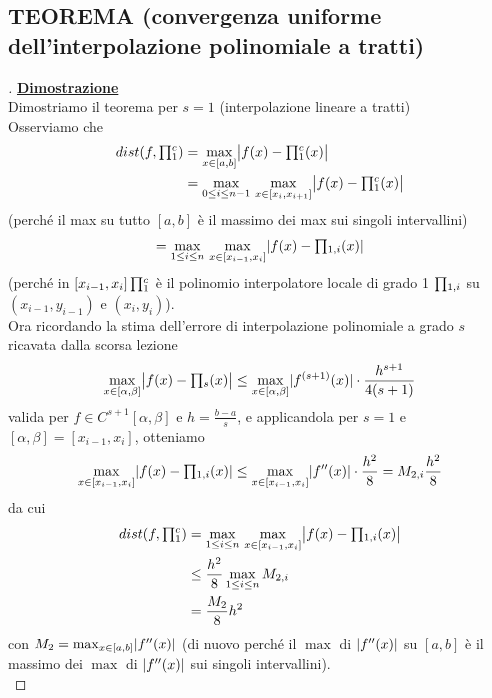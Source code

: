 \subsection{TEOREMA (convergenza uniforme dell'interpolazione polinomiale a tratti)}
\begin{center}
\end{center}

\begin{proof}[\unskip\nopunct]
\textbf{\uline{Dimostrazione}}\\
Dimostriamo il teorema per $s=1$ (interpolazione lineare a tratti)\\
Osserviamo che
\[ \begin{split}
    dist(f, \inter_{1}^{c}) & = \max_{x \in [a,b]} \abs*{f(x) - \inter_{1}^{c} (x)} \\
    & = \max_{0 \le i \le n-1}\, \max_{x \in [x_i, x_{i+1}]} \abs*{f(x) - \inter_{1}^{c} (x)}
\end{split} \]
(perché il max su tutto $[a,b]$ è il massimo dei max sui singoli intervallini)
\[= \max_{1 \le i \le n}\, \max_{x \in [x_{i-1},x_i]} \lvert f(x) - \begin{matrix}\prod\end{matrix}_{1,i}(x)\rvert\]
(perché in $[x_{i-1}, x_i] \,\begin{matrix}\prod\end{matrix}_1^c$ è il polinomio interpolatore locale di grado 1 $\begin{matrix}\prod\end{matrix}_{1,i}$ su $(x_{i-1}, y_{i-1})$ e $(x_i, y_i)$).\\
Ora ricordando la stima dell'errore di interpolazione polinomiale a grado $s$ ricavata dalla scorsa lezione
\[\max_{x\in [\alpha , \beta]}\abs*{f(x) - \inter_{s}(x)} \le \max_{x\in [\alpha , \beta]} \abs{f^{(s+1)}(x)} \cdot \frac{h^{s+1}}{4(s+1)} \]
valida per $f \in C^{s+1}[\alpha, \beta]$ e $h = \frac{b-a}{s}$, e applicandola per $s=1$ e $[\alpha,\beta] = [x_{i-1},x_i]$, otteniamo
\[ \max_{x\in [x_{i-1},x_i]}\lvert f(x) - \begin{matrix}\prod\end{matrix}_{1,i}(x)\rvert \le \max_{x\in [x_{i-1},x_i]}\lvert f''(x)\rvert \cdot \frac{h^2}{8} = M_{2,i} \frac{h^2}{8} \]
da cui
\[ \begin{split}
    dist(f, \inter_{1}^{c}) & = \max_{1 \le i \le n}\, \max_{x \in [x_{i-1},x_i]} \abs*{f(x) - \inter_{1,i}(x)} \\
    & \le \frac{h^2}{8} \max_{1 \le i \le n} M_{2,i} \\
    & = \frac{M_2}{8}h^2
\end{split} \]
con $M_2 = \max_{x\in[a,b]} \lvert f''(x)\rvert$ (di nuovo perché il $\max$ di $\lvert f''(x)\rvert$ su $[a,b]$ è il massimo dei $\max$ di $\lvert f''(x)\rvert$ sui singoli intervallini).\\
\end{proof}
